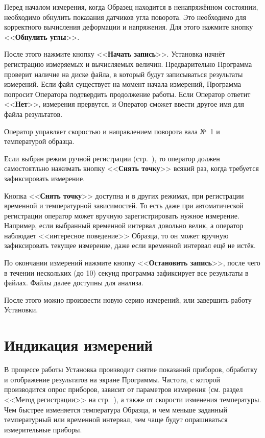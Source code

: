 \documentclass[12pt, a4paper, twocolumn]{report}
\newcommand{\CTL}[1]{<<{\bf #1}>>}
\begin{document}
Перед началом измерения, когда Образец находится в ненапряжённом состоянии, необходимо обнулить показания датчиков угла поворота. Это необходимо для корректного вычисления деформации и напряжения. Для этого нажмите кнопку \CTL{Обнулить углы}.

После этого нажмите кнопку \CTL{Начать запись}. Установка начнёт регистрацию измеряемых и вычисляемых величин. Предварительно Программа проверит наличие на диске файла, в который будут записываться результаты измерений. Если файл существует на момент начала измерений, Программа попросит Оператора подтвердить продолжение работы. Если Оператор ответит \CTL{Нет}, измерения прервутся, и Оператор сможет ввести другое имя для файла результатов.

Оператор управляет скоростью и направлением поворота вала №~1 и температурой образца.

Если выбран режим ручной регистрации (стр.~\pageref{sec_reg_type_manual}), то оператор должен самостоятльно нажимать кнопку \CTL{Снять точку}\label{sec_manual} всякий раз, когда требуется зафиксировать измерение.

Кнопка \CTL{Снять точку} доступна и в других режимах, при регистрации временной и температурной зависимостей. То есть даже при автоматической регистрации оператор может вручную зарегистрировать нужное измерение. Например, если выбранный временной интервал довольно велик, а оператор наблюдает <<интересное поведение>> Образца, то он может вручную зафиксировать текущее измерение, даже если временной интервал ещё не истёк.

По окончании измерений нажмите кнопку \CTL{Остановить запись}, после чего в течении нескольких (до 10) секунд программа зафиксирует все результаты в файлах. Файлы далее доступны для анализа.

После этого можно произвести новую серию измерений, или завершить работу Установки.

\section{Индикация измерений}

В процессе работы Установка производит снятие показаний приборов, обработку и отображение результатов на экране Программы. Частота, с которой производится опрос приборов, зависит от параметров измерения (см. раздел <<Метод регистрации>> на стр.~\pageref{sec_reg_method}), а также от скорости изменения температуры. Чем быстрее изменяется температура Образца, и чем меньше заданный температурный или временной интервал, чем чаще будут опрашиваться измерительные приборы.
\end{document}
